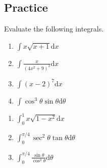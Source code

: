 



\subsection{Practice}

\begin{exercise}

Evaluate the following integrals.

\begin{enumerate}
\item
  \(\displaystyle \int x\sqrt{x+1}\mathrm{d} x\)
\item
  \(\displaystyle \int\frac{x}{(4x^2+9)^2}\mathrm{d} x\)
\item
  \(\displaystyle \int(x - 2)^7\mathrm{d} x\)
\item
  \(\displaystyle \int\cos^3 \theta\sin \theta\mathrm{d} \theta\)
\end{enumerate}

\end{exercise}

\begin{exercise}

\begin{enumerate}
\item
  \(\displaystyle \int^1_0x\sqrt{1 - x^2}\mathrm{d} x\)
\item
  \(\displaystyle \int^{\pi/4}_0\sec^2 \theta \tan \theta \mathrm{d} \theta \)
\item
  \(\displaystyle \int^{\pi/4}_0\frac{\sin \theta }{\cos^4 \theta }\mathrm{d} \theta \)
\end{enumerate}

\end{exercise}

